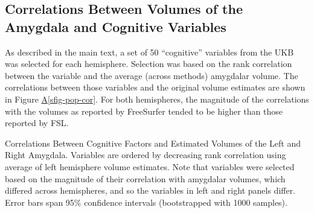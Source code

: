 \documentclass[
  authoryear,
  preprint,
  1p]{elsarticle}
\newcommand*\quartosfigref[1]{Figure \hyperref[#1]{A\ref{#1}}}
\begin{document}
\FloatBarrier

\subsection{Correlations Between Volumes of the Amygdala and Cognitive
Variables}\label{correlations-between-volumes-of-the-amygdala-and-cognitive-variables}

As described in the main text, a set of 50 ``cognitive'' variables from
the UKB was selected for each hemisphere. Selection was based on the
rank correlation between the variable and the average (across methods)
amygdalar volume. The correlations between those variables and the
original volume estimates are shown in \quartosfigref{sfig-pop-cor}. For
both hemispheres, the magnitude of the correlations with the volumes as
reported by FreeSurfer tended to be higher than those reported by FSL.

\begin{sfig}


\caption{\label{sfig-pop-cor}Correlations Between Cognitive Factors and
Estimated Volumes of the Left and Right Amygdala. Variables are ordered
by decreasing rank correlation using average of left hemisphere volume
estimates. Note that variables were selected based on the magnitude of
their correlation with amygdalar volumes, which differed across
hemispheres, and so the variables in left and right panels differ. Error
bars span 95\% confidence intervals (bootstrapped with 1000 samples).}

\end{sfig}%
\end{document}
